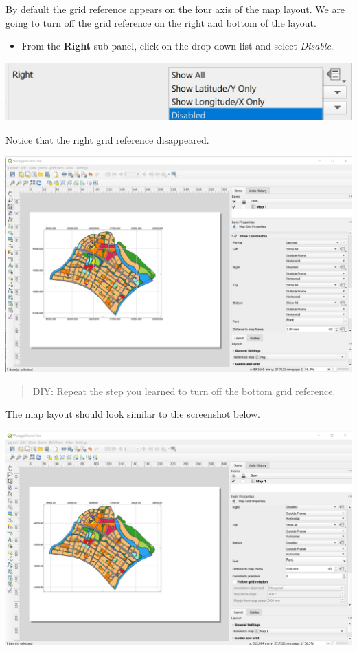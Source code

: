 \documentclass[
  letterpaper,
  DIV=11,
  numbers=noendperiod]{scrreprt}
\providecommand{\tightlist}{%
  \setlength{\itemsep}{0pt}\setlength{\parskip}{0pt}}\usepackage{longtable,booktabs,array}
\begin{document}
By default the grid reference appears on the four axis of the map
layout. We are going to turn off the grid reference on the right and
bottom of the layout.

\begin{itemize}
\tightlist
\item
  From the \textbf{Right} sub-panel, click on the drop-down list and
  select \emph{Disable}.
\end{itemize}

\includegraphics{./img04/image59.jpg}

Notice that the right grid reference disappeared.

\includegraphics{./img04/image60.jpg}

\begin{quote}
DIY: Repeat the step you learned to turn off the bottom grid reference.
\end{quote}

The map layout should look similar to the screenshot below.

\includegraphics{./img04/image61.jpg}
\end{document}
